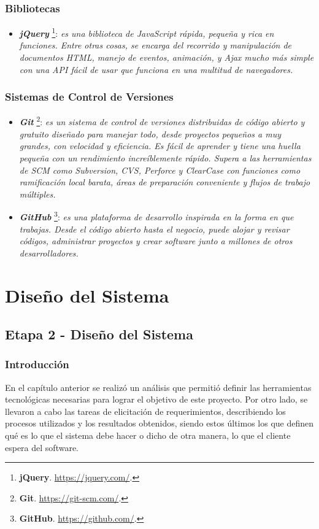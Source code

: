 \documentclass[11pt,oneside]{book}
\begin{document}
\subsection{Bibliotecas}
\begin{itemize}
\item \textit{\textbf{jQuery}} \footnote{\textbf{jQuery}. \url{https://jquery.com/}.}: \textit{es una biblioteca de JavaScript rápida, pequeña y rica en funciones. Entre otras cosas, se encarga del recorrido y manipulación de documentos HTML, manejo de eventos, animación, y Ajax mucho más simple con una API fácil de usar que funciona en una multitud de navegadores.}
\end{itemize}

\newpage
\subsection{Sistemas de Control de Versiones}
\begin{itemize}
\item \textit{\textbf{Git}} \footnote{\textbf{Git}. \url{https://git-scm.com/}.}: \textit{es un sistema de control de versiones distribuidas de código abierto y gratuito diseñado para manejar todo, desde proyectos pequeños a muy grandes, con velocidad y eficiencia. Es fácil de aprender y tiene una huella pequeña con un rendimiento increíblemente rápido. Supera a las herramientas de SCM como Subversion, CVS, Perforce y ClearCase con funciones como ramificación local barata, áreas de preparación conveniente y flujos de trabajo múltiples.}

\item \textit{\textbf{GitHub}} \footnote{\textbf{GitHub}. \url{https://github.com/}.}: \textit{es una plataforma de desarrollo inspirada en la forma en que trabajas. Desde el código abierto hasta el negocio, puede alojar y revisar códigos, administrar proyectos y crear software junto a millones de otros desarrolladores.}
\end{itemize}

\clearpage
\newpage
\chapter{Diseño del Sistema} \label{cap2}
\section{Etapa 2 - Diseño del Sistema}

\subsection{Introducción}
En el capítulo anterior se realizó un análisis que permitió definir las herramientas tecnológicas necesarias para lograr el objetivo de este proyecto. Por otro lado, se llevaron a cabo las tareas de elicitación de requerimientos, describiendo los procesos utilizados y los resultados obtenidos, siendo estos últimos los que definen qué es lo que el sistema debe hacer o dicho de otra manera, lo que el cliente espera del software. 
\end{document}
